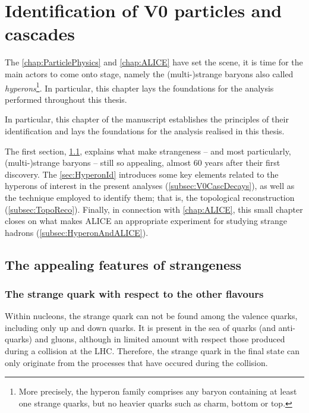 \newpage
\chapter{Identification of V0 particles and cascades}
\label{chap:V0CascReconstruction}

The \chap\ref{chap:ParticlePhysics} and \ref{chap:ALICE} have set the scene, it is time for the main actors to come onto stage, namely the (multi-)strange baryons also called \textit{hyperons}\footnote{More precisely, the hyperon family comprises any baryon containing at least one strange quarks, but no heavier quarks such as charm, bottom or top.}. In particular, this chapter lays the foundations for the analysis performed throughout this thesis.

In particular, this chapter of the manuscript establishes the principles of their identification and lays the foundations for the analysis realised in this thesis. 

The first section, \Sec\ref{sec:StrangenessFeatures}, explains what make strangeness -- and most particularly, (multi-)strange baryons -- still so appealing, almost 60 years after their first discovery. The \Sec\ref{sec:HyperonId} introduces some key elements related to the hyperons of interest in the present analyses (\Sec\ref{subsec:V0CascDecays}), as well as the technique employed to identify them; that is, the topological reconstruction (\Sec\ref{subsec:TopoReco}). Finally, in connection with \chap\ref{chap:ALICE}, this small chapter closes on what makes ALICE an appropriate experiment for studying strange hadrons (\Sec\ref{subsec:HyperonAndALICE}).


\section{The appealing features of strangeness}
\label{sec:StrangenessFeatures}

\subsection{The strange quark with respect to the other flavours}

Within nucleons, the strange quark can not be found among the valence quarks, including only up and down quarks. It is present in the sea of quarks (and anti-quarks) and gluons, although in limited amount with respect those produced during a collision at the LHC. Therefore, the strange quark in the final state can only originate from the processes that have occured during the collision.

